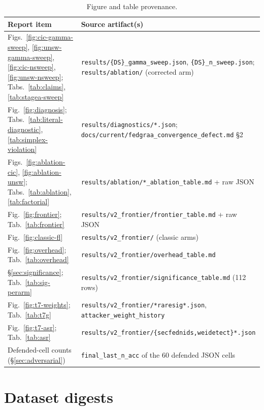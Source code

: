 \documentclass[11pt,a4paper]{report}
\begin{document}
\begin{table}[htbp]
  \centering
  \caption{Figure and table provenance.}
  \label{tab:provenance}
  \footnotesize
  \begin{tabular}{@{}p{}p{}@{}}
    \toprule
    Report item & Source artifact(s) \\
    \midrule
    Figs.~\ref{fig:cic-gamma-sweep}, \ref{fig:unsw-gamma-sweep}, \ref{fig:cic-nsweep}, \ref{fig:unsw-nsweep};
    Tabs.~\ref{tab:claims}, \ref{tab:stagea-sweep}
      & \texttt{results/\{DS\}\_gamma\_sweep.json}, \texttt{\{DS\}\_n\_sweep.json};
      \texttt{results/ablation/} (corrected arm) \\
    Fig.~\ref{fig:diagnosis};
    Tabs.~\ref{tab:literal-diagnostic}, \ref{tab:simplex-violation}
      & \texttt{results/diagnostics/*.json};
      \texttt{docs/current/fedgraa\_convergence\_defect.md} \S2 \\
    Figs.~\ref{fig:ablation-cic}, \ref{fig:ablation-unsw};
    Tabs.~\ref{tab:ablation}, \ref{tab:factorial}
      & \texttt{results/ablation/*\_ablation\_table.md} + raw JSON \\
    Fig.~\ref{fig:frontier}; Tab.~\ref{tab:frontier}
      & \texttt{results/v2\_frontier/frontier\_table.md} + raw JSON \\
    Fig.~\ref{fig:classic-fl} & \texttt{results/v2\_frontier/} (classic arms) \\
    Fig.~\ref{fig:overhead}; Tab.~\ref{tab:overhead}
      & \texttt{results/v2\_frontier/overhead\_table.md} \\
    \S\ref{sec:significance}; Tab.~\ref{tab:sig-perarm}
      & \texttt{results/v2\_frontier/significance\_table.md} (112 rows) \\
    Fig.~\ref{fig:t7-weights}; Tab.~\ref{tab:t7g}
      & \texttt{results/v2\_frontier/*raresig*.json}, \texttt{attacker\_weight\_history} \\
    Fig.~\ref{fig:t7-asr}; Tab.~\ref{tab:asr}
      & \texttt{results/v2\_frontier/\{secfednids,weidetect\}*.json} \\
    Defended-cell counts (\S\ref{sec:adversarial})
      & \texttt{final\_last\_n\_acc} of the 60 defended JSON cells \\
    \bottomrule
  \end{tabular}
\end{table}

\section{Dataset digests}
\label{sec:dataset-digests}
\end{document}
